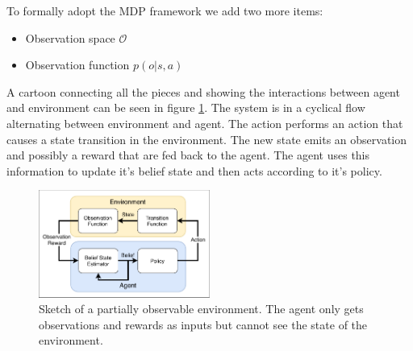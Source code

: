 To formally adopt the MDP framework we add two more items:
\begin{itemize}
    \item Observation space $\mathcal{O}$
    \item Observation function $p(o | s, a)$
\end{itemize}


A cartoon connecting all the pieces and showing the interactions between agent and environment can be seen in figure \ref{fig:background:agentenv}. The system is in a cyclical flow alternating between environment and agent. The action performs an action that causes a state transition in the environment. The new state emits an observation and possibly a reward that are fed back to the agent. The agent uses this information to update it's belief state and then acts according to it's policy.

\begin{figure}
  \centering
    \includegraphics[width=0.5\textwidth]{img/background/POMDP}
  \caption{Sketch of a partially observable environment. The agent only gets observations and rewards as inputs but cannot see the state of the environment.}
  \label{fig:background:agentenv}
\end{figure}






